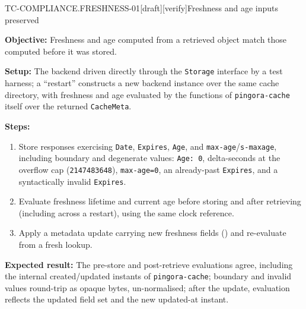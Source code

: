\begin{requirement}{TC-COMPLIANCE.FRESHNESS-01}[draft][verify]{Freshness and age inputs preserved}


  \textbf{Objective:} Freshness and age computed from a retrieved object match
  those computed before it was stored.

  \textbf{Setup:} The backend driven directly through the \texttt{Storage}
  interface by a test harness; a ``restart'' constructs a new backend instance
  over the same cache directory, with freshness and age evaluated by
  the functions of \texttt{pingora-cache} itself over the returned \texttt{CacheMeta}.

  \textbf{Steps:}
  \begin{enumerate}
    \item Store responses exercising \texttt{Date}, \texttt{Expires}, \texttt{Age},
      and \texttt{max-age}/\texttt{s-maxage}, including boundary and degenerate
      values: \texttt{Age: 0}, delta-seconds at the overflow cap
      (\texttt{2147483648}), \texttt{max-age=0}, an already-past
      \texttt{Expires}, and a syntactically invalid \texttt{Expires}.
    \item Evaluate freshness lifetime and current age before storing and after
      retrieving (including across a restart), using the same clock reference.
    \item Apply a metadata update carrying new freshness fields
      () and re-evaluate from a fresh
      lookup.
  \end{enumerate}

  \textbf{Expected result:} The pre-store and post-retrieve evaluations agree,
  including the internal created/updated instants of \texttt{pingora-cache}; boundary and invalid
  values round-trip as opaque bytes, un-normalised; after the update, evaluation
  reflects the updated field set and the new updated-at instant.



\end{requirement}

